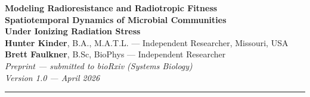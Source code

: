 \documentclass[11pt]{article}
\begin{document}
\begin{center}
  {\LARGE\bfseries Modeling Radioresistance and Radiotropic Fitness}\\[10pt]
  {\large\bfseries Spatiotemporal Dynamics of Microbial Communities\\
   Under Ionizing Radiation Stress}\\[14pt]
  {\normalsize
    \textbf{Hunter Kinder}, B.A., M.A.T.L. --- Independent Researcher, Missouri, USA\\[2pt]
    \textbf{Brett Faulkner}, B.Sc, BioPhys --- Independent Researcher\\[10pt]
  }
  {\small
    \textit{Preprint --- submitted to bioRxiv (Systems Biology)}\\
    \textit{Version 1.0 --- April 2026}
  }
\end{center}
\vspace{4pt}
\noindent\rule{\linewidth}{0.5pt}
\vspace{2pt}
\end{document}
